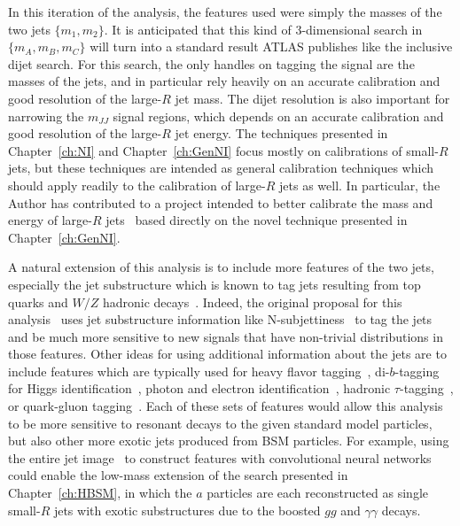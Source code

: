 In this iteration of the analysis, the features used were simply the masses of the two jets $\{m_1,m_2\}$.
It is anticipated that this kind of 3-dimensional search in $\{m_A,m_B,m_C\}$ will turn into a standard result ATLAS publishes like the inclusive dijet search.
For this search, the only handles on tagging the signal are the masses of the jets, and in particular rely heavily on an accurate calibration and good resolution of the large-$R$ jet mass.
The dijet resolution is also important for narrowing the $m_{JJ}$ signal regions, which depends on an accurate calibration and good resolution of the large-$R$ jet energy.
The techniques presented in Chapter~\ref{ch:NI} and Chapter~\ref{ch:GenNI} focus mostly on calibrations of small-$R$ jets, but these techniques are intended as general calibration techniques which should apply readily to the calibration of large-$R$ jets as well.
In particular, the Author has contributed to a project intended to better calibrate the mass and energy of large-$R$ jets~\cite{ATL-PHYS-PUB-2020-001} based directly on the novel technique presented in Chapter~\ref{ch:GenNI}.

A natural extension of this analysis is to include more features of the two jets, especially the jet substructure which is known to tag jets resulting from top quarks and $W/Z$ hadronic decays~\cite{Aaboud:2018psm}.
Indeed, the original proposal for this analysis~\cite{Collins:2018epr} uses jet substructure information like N-subjettiness~\cite{Thaler:2010tr} to tag the jets and be much more sensitive to new signals that have non-trivial distributions in those features.
Other ideas for using additional information about the jets are to include features which are typically used for heavy flavor tagging~\cite{Aad:2015ydr,Aaboud:2018xwy,Aad:2019aic}, di-$b$-tagging for Higgs identification~\cite{Aad:2019uoz}, photon and electron identification~\cite{Aad:2019tsoi,Aaboud:2019ynx}, hadronic $\tau$-tagging~\cite{Aad:2014rga,ATL-PHYS-PUB-2015-045,Aad:2015unr,ATLAS-CONF-2017-029}, or quark-gluon tagging~\cite{ATL-PHYS-PUB-2017-009}.
Each of these sets of features would allow this analysis to be more sensitive to resonant decays to the given standard model particles, but also other more exotic jets produced from BSM particles.
For example, using the entire jet image~\cite{Cogan:2014oua,deOliveira:2015xxd,ATL-PHYS-PUB-2017-017} to construct features with convolutional neural networks~\cite{fukushima1980neocognitron,lecun1998gradient,schmidhuber2015deep} could enable the low-mass extension of the search presented in Chapter~\ref{ch:HBSM}, in which the $a$ particles are each reconstructed as single small-$R$ jets with exotic substructures due to the boosted $gg$ and $\gamma\gamma$ decays.


